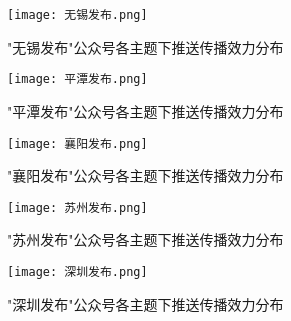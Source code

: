 \begin{figure}[htbp]
  \centering
  \texttt{[image: 无锡发布.png]}
  \caption{"无锡发布"公众号各主题下推送传播效力分布}
  \label{fig:无锡发布-box}
\end{figure}

\begin{figure}[htbp]
  \centering
  \texttt{[image: 平潭发布.png]}
  \caption{"平潭发布"公众号各主题下推送传播效力分布}
  \label{fig:平潭发布-box}
\end{figure}

\begin{figure}[htbp]
  \centering
  \texttt{[image: 襄阳发布.png]}
  \caption{"襄阳发布"公众号各主题下推送传播效力分布}
  \label{fig:襄阳发布-box}
\end{figure}

\begin{figure}[htbp]
  \centering
  \texttt{[image: 苏州发布.png]}
  \caption{"苏州发布"公众号各主题下推送传播效力分布}
  \label{fig:苏州发布-box}
\end{figure}

\begin{figure}[htbp]
  \centering
  \texttt{[image: 深圳发布.png]}
  \caption{"深圳发布"公众号各主题下推送传播效力分布}
  \label{fig:深圳发布-box}
\end{figure}
